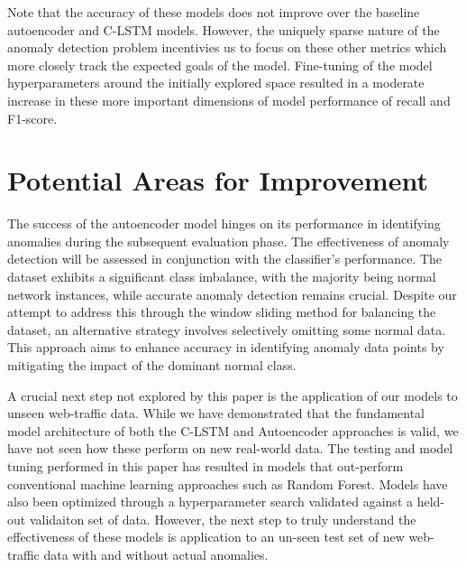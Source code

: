 \documentclass[10pt,twocolumn,letterpaper]{article}
\begin{document}
Note that the accuracy of these models does not improve over the baseline autoencoder and C-LSTM models. However, the uniquely sparse nature of the anomaly detection problem incentivies us to focus on
these other metrics which more closely track the expected goals of the model. Fine-tuning of the model hyperparameters around the initially explored space resulted in a moderate increase in these more 
important dimensions of model performance of recall and F1-score. 

\section{Potential Areas for Improvement}
The success of the autoencoder model hinges on its performance in identifying anomalies during the subsequent evaluation phase. 
The effectiveness of anomaly detection will be assessed in conjunction with the classifier's performance.
The dataset exhibits a significant class imbalance, with the majority being normal network instances, while accurate anomaly detection remains crucial. 
Despite our attempt to address this through the window sliding method for balancing the dataset, an alternative strategy involves selectively omitting some normal data. 
This approach aims to enhance accuracy in identifying anomaly data points by mitigating the impact of the dominant normal class.

A crucial next step not explored by this paper is the application of our models to unseen web-traffic data. While we have demonstrated that the fundamental model architecture of
both the C-LSTM and Autoencoder approaches is valid, we have not seen how these perform on new real-world data. The testing and model tuning performed in this paper 
has resulted in models that out-perform conventional machine learning approaches such as Random Forest. Models have also been optimized through a hyperparameter search validated
against a held-out validaiton set of data. However, the next step to truly understand the effectiveness of these models is application to an un-seen test set of new web-traffic data
with and without actual anomalies. 
{\small


}
\end{document}
